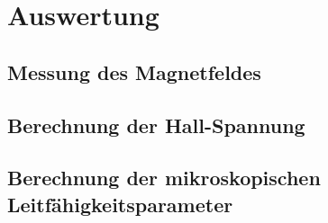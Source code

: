 \section{Auswertung}
\label{sec:Auswertung}

\subsection{Messung des Magnetfeldes}

\subsection{Berechnung der Hall-Spannung}

\subsection{Berechnung der mikroskopischen Leitfähigkeitsparameter}